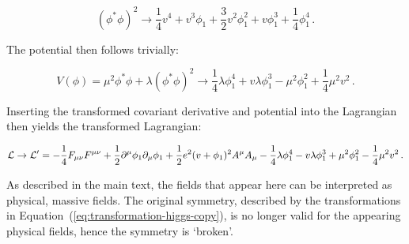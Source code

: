 % 
\begin{linenomath*}
\begin{equation}
(\phi^\ast\phi)^2
\to 
\frac{1}{4}v^4 + v^3\phi_1 + \frac{3}{2} v^2 \phi_1^2 + v\phi_1^3 + \frac{1}{4}\phi_1^4
\,.
\end{equation}
\end{linenomath*}
% 
The potential then follows trivially:
% 
\begin{linenomath*}
\begin{equation}
V(\phi) = \mu^2 \phi^\ast \phi + \lambda (\phi^\ast \phi)^2
\to
\frac{1}{4}\lambda\phi_1^4 + v\lambda\phi_1^3 - \mu^2\phi_1^2 + \frac{1}{4}\mu^2 v^2
\,.
\end{equation}
\end{linenomath*}
% 
Inserting the transformed covariant derivative and potential into the Lagrangian then yields the transformed Lagrangian:
% 
\begin{linenomath*}
\begin{equation}
\mathcal{L} \to \mathcal{L}^\prime =
    -\frac{1}{4} F_{\mu\nu} F^{\mu\nu}
    + \frac{1}{2} \partial^\mu \phi_1 \partial_\mu \phi_1
    + \frac{1}{2} e^2 (v+\phi_1)^2 A^\mu A_\mu
    - \frac{1}{4}\lambda\phi_1^4 - v\lambda\phi_1^3 + \mu^2\phi_1^2 - \frac{1}{4}\mu^2 v^2
\,.
\end{equation}
\end{linenomath*}
% 
As described in the main text, the fields that appear here can be interpreted as physical, massive fields.
% 
The original symmetry, described by the transformations in Equation~(\ref{eq:transformation-higgs-copy}), is no longer valid for the appearing physical fields, hence the symmetry is `broken'.





